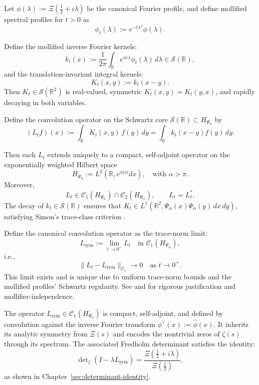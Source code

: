 \begin{definition}
\label{def:convolution-operators-Lt-Lsym}
Let \( \phi(\lambda) := \Xi\left( \tfrac{1}{2} + i\lambda \right) \) be the canonical Fourier profile, and define mollified spectral profiles for \( t > 0 \) as
\[
\phi_t(\lambda) := e^{-t\lambda^2} \phi(\lambda).
\]

Define the mollified inverse Fourier kernels:
\[
k_t(x) := \frac{1}{2\pi} \int_{\mathbb{R}} e^{i x \lambda} \phi_t(\lambda)\, d\lambda \in \mathcal{S}(\mathbb{R}),
\]
and the translation-invariant integral kernels:
\[
K_t(x,y) := k_t(x - y).
\]
Then \( K_t \in \mathcal{S}(\mathbb{R}^2) \) is real-valued, symmetric \( K_t(x,y) = K_t(y,x) \), and rapidly decaying in both variables.

Define the convolution operator on the Schwartz core \( \mathcal{S}(\mathbb{R}) \subset H_{\Psi_\alpha} \) by
\[
(L_t f)(x) := \int_{\mathbb{R}} K_t(x,y)\, f(y)\, dy = \int_{\mathbb{R}} k_t(x - y) f(y)\, dy.
\]

Then each \( L_t \) extends uniquely to a compact, self-adjoint operator on the exponentially weighted Hilbert space
\[
H_{\Psi_\alpha} := L^2(\mathbb{R}, e^{\alpha|x|} dx), \quad \text{with } \alpha > \pi.
\]
Moreover,
\[
L_t \in \mathcal{C}_1(H_{\Psi_\alpha}) \cap \mathcal{C}_2(H_{\Psi_\alpha}), \qquad L_t = L_t^*.
\]
The decay of \( k_t \in \mathcal{S}(\mathbb{R}) \) ensures that \( K_t \in L^1(\mathbb{R}^2, \Psi_\alpha(x)\Psi_\alpha(y)\, dx\,dy) \), satisfying Simon’s trace-class criterion \cite[Ch.~4]{Simon2005TraceIdeals}.

\medskip
\noindent
Define the canonical convolution operator as the trace-norm limit:
\[
L_{\mathrm{sym}} := \lim_{t \to 0^+} L_t \quad \text{in } \mathcal{C}_1(H_{\Psi_\alpha}),
\]
i.e.,
\[
\| L_t - L_{\mathrm{sym}} \|_{\mathcal{C}_1} \to 0 \quad \text{as } t \to 0^+.
\]
This limit exists and is unique due to uniform trace-norm bounds and the mollified profiles' Schwartz regularity. See  and  for rigorous justification and mollifier-independence.

\medskip
\noindent
The operator \( L_{\mathrm{sym}} \in \mathcal{C}_1(H_{\Psi_\alpha}) \) is compact, self-adjoint, and defined by convolution against the inverse Fourier transform \( \phi^\vee(x) := \widehat{\phi}(x) \). It inherits its analytic symmetry from \( \Xi(s) \) and encodes the nontrivial zeros of \( \zeta(s) \) through its spectrum. The associated Fredholm determinant satisfies the identity:
\[
\det\nolimits_{\zeta}(I - \lambda L_{\mathrm{sym}}) = \frac{\Xi\left( \tfrac{1}{2} + i\lambda \right)}{\Xi\left( \tfrac{1}{2} \right)},
\]
as shown in Chapter~\ref{sec:determinant-identity}.
\end{definition}
% 